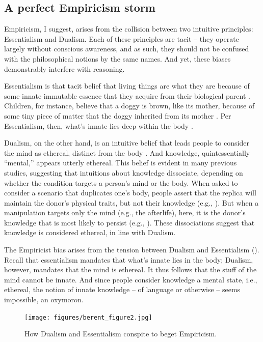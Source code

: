 \documentclass[output=paper,colorlinks,citecolor=brown
]{langscibook}
\begin{document}
\subsection{A perfect Empiricism storm}
Empiricism, I suggest, arises from the collision between two intuitive principles: Essentialism and Dualism. Each of these principles are tacit -- they operate largely without conscious awareness, and as such, they should not be confused with the philosophical notions by the same names. And yet, these biases demonstrably interfere with reasoning.

Essentialism is that tacit belief that living things are what they are because of some innate immutable essence that they acquire from their biological parent \citep{keil1986acquisition,gelman2003essential}. Children, for instance, believe that a doggy is brown, like its mother, because of some tiny piece of matter that the doggy inherited from its mother \citep{springer1991early}. Per Essentialism, then, what’s innate lies deep within the body \citep{springer1991early}.

Dualism, on the other hand, is an intuitive belief that leads people to consider the mind as ethereal, distinct from the body \citep{bloom2005descartes}. And knowledge, quintessentially “mental,” appears utterly ethereal. This belief is evident in many previous studies, suggesting that intuitions about knowledge dissociate, depending on whether the condition targets a person’s mind or the body. When asked to consider a scenario that duplicates one’s body, people assert that the replica will maintain the donor’s physical traits, but not their knowledge (e.g., \cite{hood2012children}). But when a manipulation targets only the mind (e.g., the afterlife), here, it is the donor’s knowledge that is most likely to persist (e.g., \cite{bering2004natural}). These dissociations suggest that knowledge is considered ethereal, in line with Dualism.

The Empiricist bias arises from the tension between Dualism and Essentialism (). Recall that essentialism mandates that what’s innate lies in the body; Dualism, however, mandates that the mind is ethereal. It thus follows that the stuff of the mind cannot be innate. And since people consider knowledge a mental state, i.e., ethereal, the notion of innate knowledge -- of language or otherwise -- seems impossible, an oxymoron. 

\begin{figure}
    \centering
    \texttt{[image: figures/berent\_figure2.jpg]}
    \caption{How Dualism and Essentialism conspite to beget Empiricism. }
    \label{fig:figure2}
\end{figure}
\end{document}
